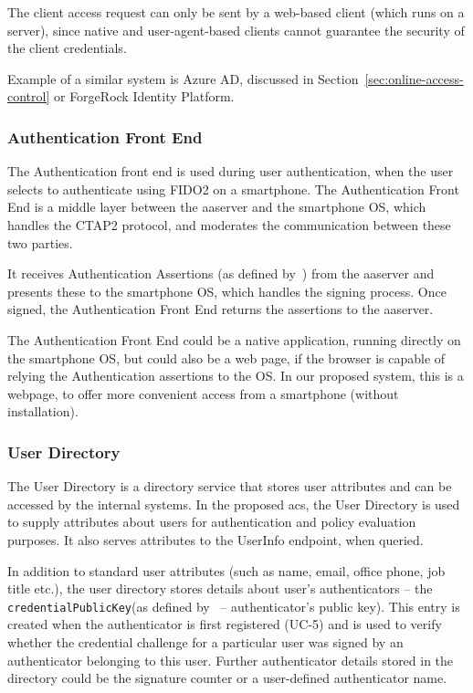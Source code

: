 The client access request can only be sent by a web-based client (which runs on a server), since native and user-agent-based clients cannot guarantee the security of the client credentials.

\bigskip \noindent
Example of a similar system is Azure AD, discussed in Section~\ref{sec:online-access-control} or ForgeRock Identity Platform\footnotemark.
% 
    
\subsubsection{Authentication Front End}
The Authentication front end is used during user authentication, when the user selects to authenticate using FIDO2 on a smartphone. The Authentication Front End is a middle layer between the \acrshort{aaserver} and the smartphone OS, which handles the CTAP2 protocol, and moderates the communication between these two parties.

It receives Authentication Assertions (as defined by~\cite{Balfanz2019Web1}) from the \acrshort{aaserver} and presents these to the smartphone OS, which handles the signing process. Once signed, the Authentication Front End returns the assertions to the \acrshort{aaserver}.

The Authentication Front End could be a native application, running directly on the smartphone OS, but could also be a web page, if the browser is capable of relying the Authentication assertions to the OS\footnotemark. In our proposed system, this is a webpage, to offer more convenient access from a smartphone (without installation).
% 

\subsubsection{User Directory}
The User Directory is a directory service that stores user attributes and can be accessed by the internal systems. In the proposed \acrshort{acs}, the User Directory is used to supply attributes about users for authentication and policy evaluation purposes. It also serves attributes to the UserInfo endpoint, when queried.

In addition to standard user attributes (such as name, email, office phone, job title etc.), the user directory stores details about user's authenticators -- the \texttt{credentialPublicKey}(as defined by~\cite{Balfanz2019Web1} -- authenticator's public key). This entry is created when the authenticator is first registered (UC-5) and is used to verify whether the credential challenge for a particular user was signed by an authenticator belonging to this user. Further authenticator details stored in the directory could be the signature counter or a user-defined authenticator name.

